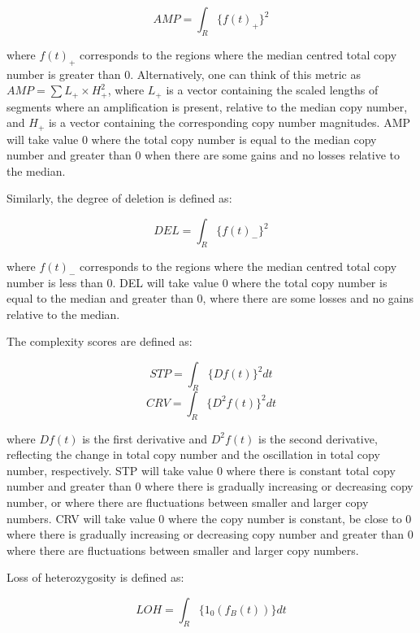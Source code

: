 \begin{equation}
AMP = \int_{R}{\{f(t)_+\}^2} 
\end{equation}

where $f(t)_+$ corresponds to the regions where the median centred total copy number is greater than 0. Alternatively, one can think of this metric as $AMP = \sum L_+ \times H_+^2$, where $L_+$ is a vector containing the scaled lengths of segments where an amplification is present, relative to the median copy number, and $H_+$ is a vector containing the corresponding copy number magnitudes. AMP will take value 0 where the total copy number is equal to the median copy number and greater than 0 when there are some gains and no losses relative to the median. 

Similarly, the degree of deletion is defined as: 

\begin{equation}
DEL = \int_{R}{\{f(t)_-\}^2}
\end{equation}

where $f(t)_-$ corresponds to the regions where the median centred total copy number is less than 0. DEL will take value 0 where the total copy number is equal to the median and greater than 0, where there are some losses and no gains relative to the median.   

The complexity scores are defined as: 

\begin{equation}
STP = \int_{R}{\{Df(t)\}^2} dt
\end{equation}
\begin{equation}
CRV = \int_{R}{\{D^2f(t)\}^2} dt
\end{equation} 

where $Df(t)$ is the first derivative and $D^2f(t)$ is the second derivative, reflecting the change in total copy number and the oscillation in total copy number, respectively. STP will take value 0 where there is constant total copy number and greater than 0 where there is gradually increasing or decreasing copy number, or where there are fluctuations between smaller and larger copy numbers. CRV will take value 0 where the copy number is constant, be close to 0 where there is gradually increasing or decreasing copy number and greater than 0 where there are fluctuations between smaller and larger copy numbers. 

Loss of heterozygosity is defined as: 

\begin{equation}
LOH =  \int_{R}{\{1_0(f_B(t))\}} dt
\end{equation}

